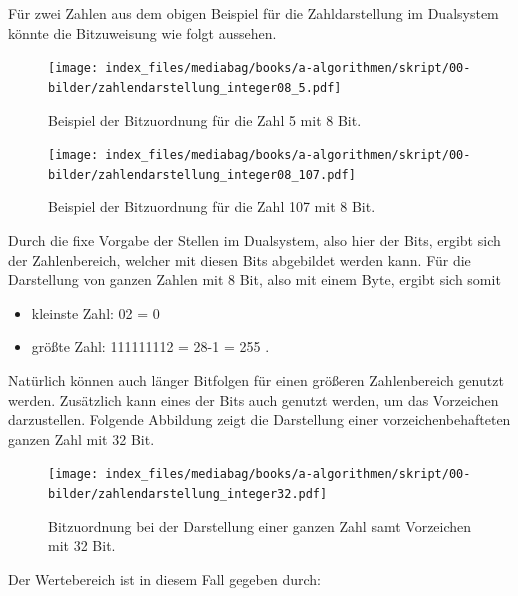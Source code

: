 \documentclass[
  letterpaper,
  DIV=11,
  numbers=noendperiod]{scrreprt}
\providecommand{\tightlist}{%
  \setlength{\itemsep}{0pt}\setlength{\parskip}{0pt}}\usepackage{longtable,booktabs,array}
\begin{document}
Für zwei Zahlen aus dem obigen Beispiel für die Zahldarstellung im
Dualsystem könnte die Bitzuweisung wie folgt aussehen.

\begin{figure}[H]

{\centering \texttt{[image: index\_files/mediabag/books/a-algorithmen/skript/00-bilder/zahlendarstellung\_integer08\_5.pdf]}

}

\caption{Beispiel der Bitzuordnung für die Zahl 5 mit 8 Bit.}

\end{figure}%
\begin{figure}[H]

{\centering \texttt{[image: index\_files/mediabag/books/a-algorithmen/skript/00-bilder/zahlendarstellung\_integer08\_107.pdf]}

}

\caption{Beispiel der Bitzuordnung für die Zahl 107 mit 8 Bit.}

\end{figure}%

Durch die fixe Vorgabe der Stellen im Dualsystem, also hier der Bits,
ergibt sich der Zahlenbereich, welcher mit diesen Bits abgebildet werden
kann. Für die Darstellung von ganzen Zahlen mit 8 Bit, also mit einem
Byte, ergibt sich somit

\begin{itemize}
\tightlist
\item
  kleinste Zahl: 02 = 0
\item
  größte Zahl: 111111112 = 28-1 = 255 .
\end{itemize}

Natürlich können auch länger Bitfolgen für einen größeren Zahlenbereich
genutzt werden. Zusätzlich kann eines der Bits auch genutzt werden, um
das Vorzeichen darzustellen. Folgende Abbildung zeigt die Darstellung
einer vorzeichenbehafteten ganzen Zahl mit 32 Bit.

\begin{figure}[H]

{\centering \texttt{[image: index\_files/mediabag/books/a-algorithmen/skript/00-bilder/zahlendarstellung\_integer32.pdf]}

}

\caption{Bitzuordnung bei der Darstellung einer ganzen Zahl samt
Vorzeichen mit 32 Bit.}

\end{figure}%

Der Wertebereich ist in diesem Fall gegeben durch:
\end{document}
